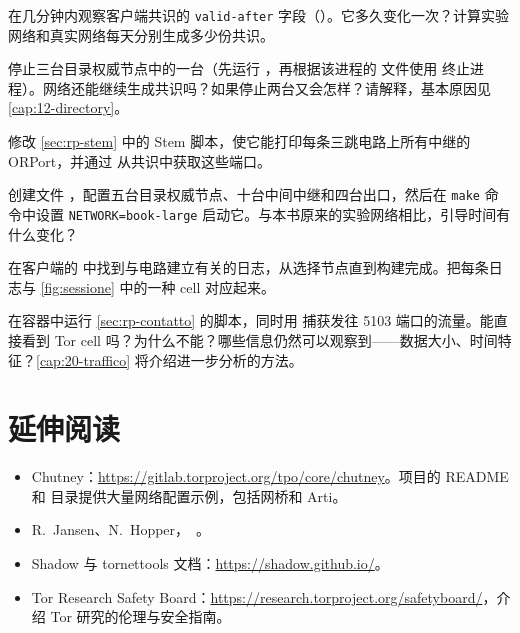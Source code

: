 \begin{esercizio}[2]\label{es:19-consenso}
在几分钟内观察客户端共识的 \texttt{valid-after} 字段（）。它多久变化一次？计算实验网络和真实网络每天分别生成多少份共识。
\end{esercizio}

\begin{esercizio}[2]\label{es:19-autorita}
停止三台目录权威节点中的一台（先运行 ，再根据该进程的  文件使用  终止进程）。网络还能继续生成共识吗？如果停止两台又会怎样？请解释，基本原因见 \cref{cap:12-directory}。
\end{esercizio}

\begin{esercizio}[2]\label{es:19-stem}
修改 \cref{sec:rp-stem} 中的 Stem 脚本，使它能打印每条三跳电路上所有中继的 ORPort，并通过  从共识中获取这些端口。
\end{esercizio}

\begin{esercizio}[2]\label{es:19-rete}
创建文件 ，配置五台目录权威节点、十台中间中继和四台出口，然后在 \texttt{make} 命令中设置 \texttt{NETWORK=book-large} 启动它。与本书原来的实验网络相比，引导时间有什么变化？
\end{esercizio}

\begin{esercizio}[3]\label{es:19-log}
在客户端的  中找到与电路建立有关的日志，从选择节点直到构建完成。把每条日志与 \cref{fig:sessione} 中的一种 cell 对应起来。
\end{esercizio}

\begin{esercizio}[3]\label{es:19-cattura}
在容器中运行 \cref{sec:rp-contatto} 的脚本，同时用  捕获发往 5103 端口的流量。能直接看到 Tor cell 吗？为什么不能？哪些信息仍然可以观察到——数据大小、时间特征？\cref{cap:20-traffico} 将介绍进一步分析的方法。
\end{esercizio}

\section*{延伸阅读}
\begin{itemize}
  \item Chutney：\url{https://gitlab.torproject.org/tpo/core/chutney}。项目的 README 和  目录提供大量网络配置示例，包括网桥和 Arti。
  \item R.~Jansen、N.~Hopper，~\cite{jansen2012shadow}。
  \item Shadow 与 tornettools 文档：\url{https://shadow.github.io/}。
  \item Tor Research Safety Board：\url{https://research.torproject.org/safetyboard/}，介绍 Tor 研究的伦理与安全指南。
\end{itemize}
